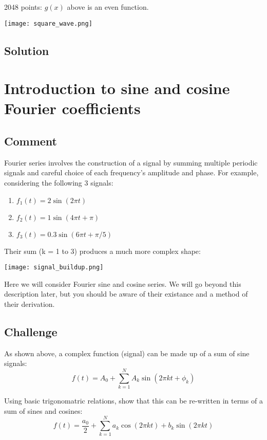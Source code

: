 2048 points: $g(x)$ above is an even function.

\texttt{[image: square\_wave.png]}

\subsection*{Solution}




\newpage

\section{Introduction to sine and cosine Fourier coefficients}
\label{sec:trigcoeff}

\subsection*{Comment}
Fourier series involves the construction of a signal by summing multiple periodic signals and careful choice of each frequency's amplitude and phase. For example, considering the following 3 signals:
\begin{enumerate}
    \item $f_1(t) = 2 \sin(2 \pi t)$
    \item $f_2(t) = 1 \sin(4 \pi t + \pi)$
    \item $f_3(t) = 0.3 \sin(6 \pi t + \pi/5)$
\end{enumerate}
Their sum (k = 1 to 3) produces a much more complex shape:

\texttt{[image: signal\_buildup.png]}

Here we will consider Fourier sine and cosine series. We will go beyond this description later, but you should be aware of their existance and a method of their derivation.

\subsection*{Challenge}
As shown above, a complex function (signal) can be made up of a sum of sine signals:
\begin{equation}
    \label{eq:fssinonly}
    f(t) = A_0 + \sum_{k=1}^{N} A_k \sin(2 \pi k t + \phi_k)
\end{equation}

Using basic trigonomatric relations, show that this can be re-written in terms of a sum of sines and cosines:
\begin{equation}
    \label{eq:fssincos}
    f(t) = \frac{a_0}{2} + \sum_{k=1}^{N} a_k \cos(2 \pi k t) + b_k \sin(2 \pi k t)
\end{equation}

